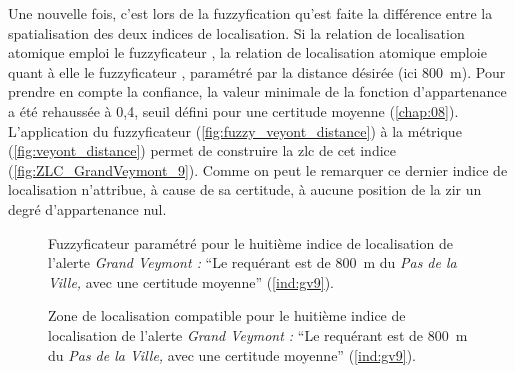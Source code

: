 Une nouvelle fois, c'est lors de la fuzzyfication qu'est faite la
différence entre la spatialisation des deux indices de
localisation. Si la relation de localisation atomique
 emploi le fuzzyficateur
, la relation de localisation atomique
 emploie quant à
elle le fuzzyficateur , paramétré par la distance
désirée (ici \SI{800}{\meter}). Pour prendre en compte la confiance,
la valeur minimale de la fonction d'appartenance a été rehaussée à
0,4, seuil défini pour une certitude moyenne
(\autoref{chap:08}). L’application du fuzzyficateur
(\autoref{fig:fuzzy_veyont_distance}) à la métrique
(\autoref{fig:veyont_distance}) permet de construire la \ac{zlc} de
cet indice (\autoref{fig:ZLC_GrandVeymont_9}). Comme on peut le
remarquer ce dernier indice de localisation n'attribue, à cause de sa
certitude, à aucune position de la \ac{zir} un degré d'appartenance
nul.

\begin{figure}
  \centering 
  \caption{Fuzzyficateur \protect{} paramétré pour
    le huitième indice de localisation de l'alerte \emph{Grand Veymont
      :} \enquote{Le requérant est
      \protect{} de \SI{800}{\meter}
      du \emph{Pas de la Ville,} avec une certitude moyenne}
    (\ref{ind:gv9}).}
  \label{fig:fuzzy_veyont_distance}
\end{figure}



\begin{figure}
  \centering
  
  \caption{Zone de localisation compatible pour le huitième indice de
    localisation de l'alerte \emph{Grand Veymont :} \enquote{Le
      requérant est \protect{} de
      \SI{800}{\meter} du \emph{Pas de la Ville,} avec une certitude
      moyenne} (\ref{ind:gv9}).}
  \label{fig:ZLC_GrandVeymont_9}
\end{figure}


